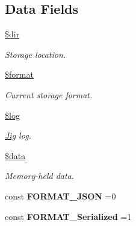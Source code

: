 \subsection*{Data Fields}
\begin{DoxyCompactItemize}
\item 
\hypertarget{class_d_b_1_1_jig_a1659f0a629d408e0f849dbe4ee061e62}{}\label{class_d_b_1_1_jig_a1659f0a629d408e0f849dbe4ee061e62} 
\hyperlink{class_d_b_1_1_jig_a1659f0a629d408e0f849dbe4ee061e62}{\$dir}
\begin{DoxyCompactList}\small\item\em Storage location. \end{DoxyCompactList}\item 
\hypertarget{class_d_b_1_1_jig_a1e6e4ea377a908a5407c435e9054e3a9}{}\label{class_d_b_1_1_jig_a1e6e4ea377a908a5407c435e9054e3a9} 
\hyperlink{class_d_b_1_1_jig_a1e6e4ea377a908a5407c435e9054e3a9}{\$format}
\begin{DoxyCompactList}\small\item\em Current storage format. \end{DoxyCompactList}\item 
\hypertarget{class_d_b_1_1_jig_a9a2cf15a653aee8be437f7ae474cd494}{}\label{class_d_b_1_1_jig_a9a2cf15a653aee8be437f7ae474cd494} 
\hyperlink{class_d_b_1_1_jig_a9a2cf15a653aee8be437f7ae474cd494}{\$log}
\begin{DoxyCompactList}\small\item\em \hyperlink{class_d_b_1_1_jig}{Jig} log. \end{DoxyCompactList}\item 
\hypertarget{class_d_b_1_1_jig_a6efc15b5a2314dd4b5aaa556a375c6d6}{}\label{class_d_b_1_1_jig_a6efc15b5a2314dd4b5aaa556a375c6d6} 
\hyperlink{class_d_b_1_1_jig_a6efc15b5a2314dd4b5aaa556a375c6d6}{\$data}
\begin{DoxyCompactList}\small\item\em Memory-\/held data. \end{DoxyCompactList}\end{DoxyCompactItemize}
{\bf }\par
\begin{DoxyCompactItemize}
\item 
\hypertarget{class_d_b_1_1_jig_ab5b06d4e1b51345fd3778b422815451d}{}\label{class_d_b_1_1_jig_ab5b06d4e1b51345fd3778b422815451d} 
const {\bfseries F\+O\+R\+M\+A\+T\+\_\+\+J\+S\+ON} =0
\item 
\hypertarget{class_d_b_1_1_jig_a8e7a886766aa7d2923696e6e11a84c2f}{}\label{class_d_b_1_1_jig_a8e7a886766aa7d2923696e6e11a84c2f} 
const {\bfseries F\+O\+R\+M\+A\+T\+\_\+\+Serialized} =1
\end{DoxyCompactItemize}

